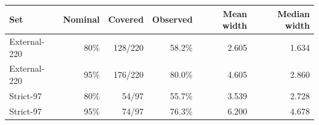 \begin{longtable}{@{}lrrrrr@{}}
\toprule
Set & Nominal & Covered & Observed & Mean width & Median width \\
\midrule
\endhead
External-220 & 80\% & 128/220 & 58.2\% & 2.605 & 1.634 \\
External-220 & 95\% & 176/220 & 80.0\% & 4.605 & 2.860 \\
Strict-97 & 80\% & 54/97 & 55.7\% & 3.539 & 2.728 \\
Strict-97 & 95\% & 74/97 & 76.3\% & 6.200 & 4.678 \\
\bottomrule\end{longtable}
